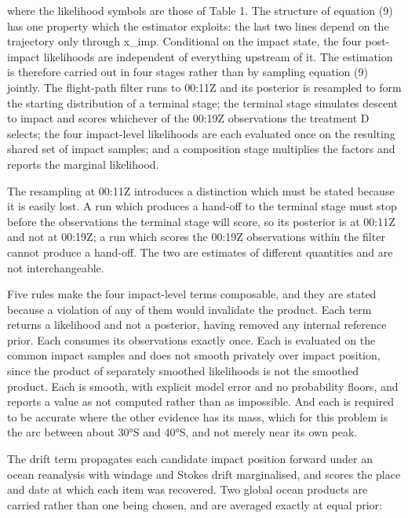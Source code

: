 \documentclass[12pt,a4paper]{article}
\makeatletter
\renewcommand\subsection{\@startsection{subsection}{2}{0pt}{8pt}{3pt}{\normalfont\normalsize\mdseries\itshape}}
\makeatother
\begin{document}
where the likelihood symbols are those of Table 1. The structure of equation (9) has one property which the estimator exploits: the last two lines depend on the trajectory only through x_imp. Conditional on the impact state, the four post-impact likelihoods are independent of everything upstream of it. The estimation is therefore carried out in four stages rather than by sampling equation (9) jointly. The flight-path filter runs to 00:11Z and its posterior is resampled to form the starting distribution of a terminal stage; the terminal stage simulates descent to impact and scores whichever of the 00:19Z observations the treatment D selects; the four impact-level likelihoods are each evaluated once on the resulting shared set of impact samples; and a composition stage multiplies the factors and reports the marginal likelihood.

The resampling at 00:11Z introduces a distinction which must be stated because it is easily lost. A run which produces a hand-off to the terminal stage must stop before the observations the terminal stage will score, so its posterior is at 00:11Z and not at 00:19Z; a run which scores the 00:19Z observations within the filter cannot produce a hand-off. The two are estimates of different quantities and are not interchangeable.

\subsection{2.7.  The impact-level likelihoods}

Five rules make the four impact-level terms composable, and they are stated because a violation of any of them would invalidate the product. Each term returns a likelihood and not a posterior, having removed any internal reference prior. Each consumes its observations exactly once. Each is evaluated on the common impact samples and does not smooth privately over impact position, since the product of separately smoothed likelihoods is not the smoothed product. Each is smooth, with explicit model error and no probability floors, and reports a value as not computed rather than as impossible. And each is required to be accurate where the other evidence has its mass, which for this problem is the arc between about 30°S and 40°S, and not merely near its own peak.

The drift term propagates each candidate impact position forward under an ocean reanalysis with windage and Stokes drift marginalised, and scores the place and date at which each item was recovered. Two global ocean products are carried rather than one being chosen, and are averaged exactly at equal prior:
\end{document}
